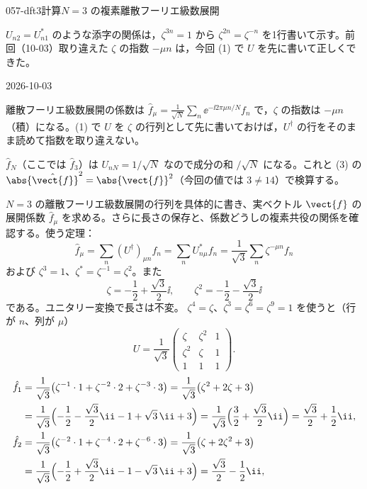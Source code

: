 \documentclass[uplatex,dvipdfmx,a4paper,11pt]{jsarticle}
\begin{document}
\begin{mondai}{057-dft3}{計算}{$N=3$ の複素離散フーリエ級数展開}
\begin{kizuki}
\item $U_{n2}=U_{n1}^{*}$ のような添字の関係は，$\zeta^{3n}=1$ から $\zeta^{2n}=\zeta^{-n}$ を1行書いて示す。前回（10-03）取り違えた $\zeta$ の指数 $-\mu n$ は，今回 (1) で $U$ を先に書いて正しくできた。
\end{kizuki}
\begin{maekizuki}{2026-10-03}
\item 離散フーリエ級数展開の係数は $\hat{f}_{\mu}=\frac{1}{\sqrt{N}}\sum_n\ee^{-\ii2\pi\mu n/N}f_n$ で，$\zeta$ の指数は $-\mu n$（積）になる。(1) で $U$ を $\zeta$ の行列として先に書いておけば，$U^{\dagger}$ の行をそのまま読めて指数を取り違えない。
\item $\hat{f}_N$（ここでは $\hat{f}_3$）は $U_{nN}=1/\sqrt{N}$ なので成分の和 $/\sqrt{N}$ になる。これと (3) の $\abs{\hat{\vect{f}}}^{2}=\abs{\vect{f}}^{2}$（今回の値では $3\neq14$）で検算する。
\end{maekizuki}
\begin{tadashii}
\houshin $N=3$ の離散フーリエ級数展開の行列を具体的に書き、実ベクトル $\vect{f}$ の展開係数 $\hat{f}_{\mu}$ を求める。さらに長さの保存と、係数どうしの複素共役の関係を確認する。使う定理：
\[
\hat{f}_{\mu}=\sum_{n}(U^{\dagger})_{\mu n}f_n=\sum_n U_{n\mu}^{*}f_n=\frac{1}{\sqrt{3}}\sum_n\zeta^{-\mu n}f_n
\]
および $\zeta^{3}=1$、$\zeta^{*}=\zeta^{-1}=\zeta^{2}$。また
\[
\zeta=-\frac{1}{2}+\frac{\sqrt{3}}{2}\ii,\qquad \zeta^{2}=-\frac{1}{2}-\frac{\sqrt{3}}{2}\ii
\]
である。ユニタリー変換で長さは不変。
\keisan
{} $\zeta^{4}=\zeta$、$\zeta^{3}=\zeta^{6}=\zeta^{9}=1$ を使うと（行が $n$、列が $\mu$）
\[
U=\frac{1}{\sqrt{3}}\begin{pmatrix}\zeta&\zeta^{2}&1\\\zeta^{2}&\zeta&1\\1&1&1\end{pmatrix}.
\]
\begin{align*}
\hat{f}_1&=\frac{1}{\sqrt{3}}\bigl(\zeta^{-1}\cdot1+\zeta^{-2}\cdot2+\zeta^{-3}\cdot3\bigr)=\frac{1}{\sqrt{3}}\bigl(\zeta^{2}+2\zeta+3\bigr)\\
&=\frac{1}{\sqrt{3}}\Bigl(-\frac{1}{2}-\frac{\sqrt{3}}{2}\ii-1+\sqrt{3}\,\ii+3\Bigr)=\frac{1}{\sqrt{3}}\Bigl(\frac{3}{2}+\frac{\sqrt{3}}{2}\ii\Bigr)=\frac{\sqrt{3}}{2}+\frac{1}{2}\ii,\\
\hat{f}_2&=\frac{1}{\sqrt{3}}\bigl(\zeta^{-2}\cdot1+\zeta^{-4}\cdot2+\zeta^{-6}\cdot3\bigr)=\frac{1}{\sqrt{3}}\bigl(\zeta+2\zeta^{2}+3\bigr)\\
&=\frac{1}{\sqrt{3}}\Bigl(-\frac{1}{2}+\frac{\sqrt{3}}{2}\ii-1-\sqrt{3}\,\ii+3\Bigr)=\frac{\sqrt{3}}{2}-\frac{1}{2}\ii,\\

\end{align*}
\end{tadashii}
\end{mondai}
\end{document}
